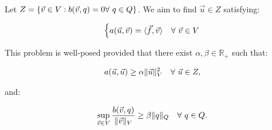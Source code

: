 Let $Z = \{\vec{v} \in V: b(\vec{v}, q) = 0 \forall ~ q \in Q\}$. We aim to find $\vec{u} \in Z$ satisfying:

\begin{gather}
    \begin{cases}
        a(\vec{u}, \vec{v}) = \langle \vec{f}, \vec{v} \rangle & \forall ~ \vec{v} \in V
    \end{cases}
\end{gather}

This problem is well-posed provided that there exist $\alpha, \beta \in \mathbb{R}_+$ such that:

\begin{gather}
    a(\vec{u}, \vec{u}) \geq \alpha \lVert \vec{u} \rVert^2_V \quad \forall ~ \vec{u} \in Z,
\end{gather}

and:

\begin{gather}
    \sup_{\vec{v} \in V} \frac{b(\vec{v}, q)}{\lVert \vec{v} \rVert_V} \geq \beta \lVert q \rVert_Q \quad \forall ~ q \in Q.
\end{gather}